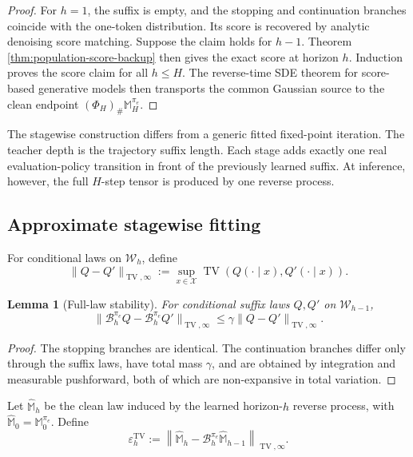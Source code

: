 \documentclass[11pt]{article}
\newtheorem{lemma}[theorem]{Lemma}
\theoremstyle{definition}
\theoremstyle{remark}
\newcommand{\Xspace}{\mathcal X}
\newcommand{\Wspace}{\mathcal W}
\newcommand{\TV}{\operatorname{TV}}
\newcommand{\Bell}{\mathcal B}
\newcommand{\targetpi}{\pi_e}
\begin{document}
\begin{proof}
For $h=1$, the suffix is empty, and the stopping and continuation branches
coincide with the one-token distribution. Its score is recovered by analytic
denoising score matching. Suppose the claim holds for $h-1$. Theorem
\ref{thm:population-score-backup} then gives the exact score at horizon $h$.
Induction proves the score claim for all $h\leq H$. The reverse-time SDE theorem
for score-based generative models then transports the common Gaussian source
to the clean endpoint $(\Phi_H)_{\#}\mathbb M_H^{\targetpi}$.
\end{proof}

The stagewise construction differs from a generic fitted fixed-point iteration.
The teacher depth is the trajectory suffix length. Each stage adds exactly one
real evaluation-policy transition in front of the previously learned suffix.
At inference, however, the full $H$-step tensor is produced by one reverse
process.

\subsection{Approximate stagewise fitting}

For conditional laws on $\Wspace_h$, define
\begin{equation}
\|Q-Q'\|_{\TV,\infty}
:=
\sup_{x\in\Xspace}
\TV(Q(\cdot\mid x),Q'(\cdot\mid x)).
\end{equation}

\begin{lemma}[Full-law stability]
\label{lem:bellman-stability}
For conditional suffix laws $Q,Q'$ on $\Wspace_{h-1}$,
\begin{equation}
\boxed{
\|\Bell_h^{\targetpi}Q-\Bell_h^{\targetpi}Q'\|_{\TV,\infty}
\leq
\gamma
\|Q-Q'\|_{\TV,\infty}.
}
\label{eq:bellman-tv-stability}
\end{equation}
\end{lemma}

\begin{proof}
The stopping branches are identical. The continuation branches differ only
through the suffix laws, have total mass $\gamma$, and are obtained by
integration and measurable pushforward, both of which are non-expansive in
total variation.
\end{proof}

Let $\widehat{\mathbb M}_h$ be the clean law induced by the learned
horizon-$h$ reverse process, with
$\widehat{\mathbb M}_0=\mathbb M_0^{\targetpi}$. Define
\begin{equation}
\varepsilon_h^{\TV}
:=
\left\|
\widehat{\mathbb M}_h
-
\Bell_h^{\targetpi}\widehat{\mathbb M}_{h-1}
\right\|_{\TV,\infty}.
\label{eq:tv-stage-error}
\end{equation}
\end{document}
